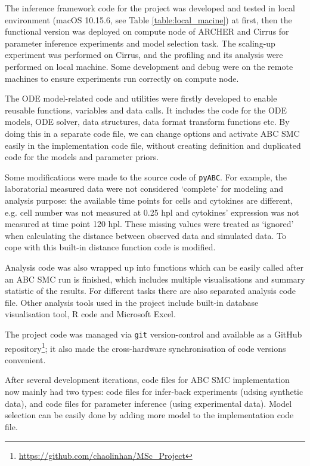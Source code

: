 \documentclass[12pt,a4paper]{report}
\begin{document}
The inference framework code for the project was developed and tested in local environment (macOS 10.15.6, see Table \ref{table:local_macine}) at first, then the functional version was deployed on compute node of ARCHER and Cirrus for parameter inference experiments and model selection task. The scaling-up experiment was performed on Cirrus, and the profiling and its analysis were performed on local machine. Some development and debug were on the remote machines to ensure experiments run correctly on compute node.

The ODE model-related code and utilities were firstly developed to enable reusable functions, variables and data calls. It includes the code for the ODE models, ODE solver, data structures, data format transform functions etc. By doing this in a separate code file, we can change options and activate ABC SMC easily in the implementation code file, without creating definition and duplicated code for the models and parameter priors.

Some modifications were made to the source code of \verb|pyABC|. For example, the laboratorial measured data were not considered `complete' for modeling and analysis purpose: the available time points for cells and cytokines are different, e.g. cell number was not measured at 0.25 hpl and cytokines' expression was not measured at time point 120 hpl. These missing values were treated as `ignored' when calculating the distance between observed data and simulated data. To cope with this built-in distance function code is modified.

Analysis code was also wrapped up into functions which can be easily called after an ABC SMC run is finished, which includes multiple visualisations and summary statistic of the results. For different tasks there are also separated analysis code file. Other analysis tools used in the project include built-in database visualisation tool, R code and Microsoft Excel.

The project code was managed via \verb|git| version-control and available as a GitHub repository\footnote{\url{https://github.com/chaolinhan/MSc_Project}}; it also made the cross-hardware synchronisation of code versions convenient.

After several development iterations, code files for ABC SMC implementation now mainly had two types: code files for infer-back experiments (udsing synthetic data), and code files for parameter inference (using experimental data). Model selection can be easily done by adding more model to the implementation code file.
\end{document}
